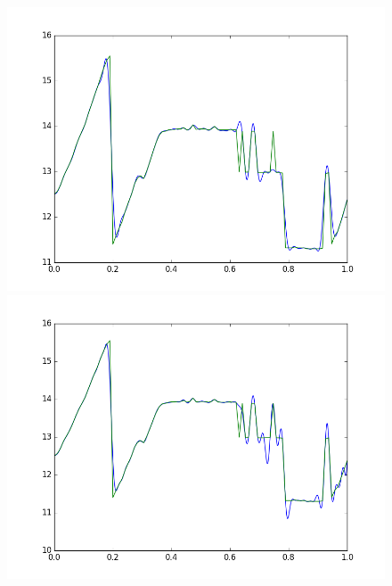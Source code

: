 \documentclass[]{jsarticle}
\begin{document}
\begin{figure}[htbp]
 \begin{minipage}[b]{0.5\hsize}
  \includegraphics[scale=0.4]{./images/02gauss_sq.png}
 \end{minipage}
 \begin{minipage}[b]{0.5\hsize}
  \includegraphics[scale=0.4]{./images/02gauss100c.png}
 \end{minipage}
 \begin{minipage}[b]{0.5\hsize}

\end{minipage}
\end{figure}
\end{document}
